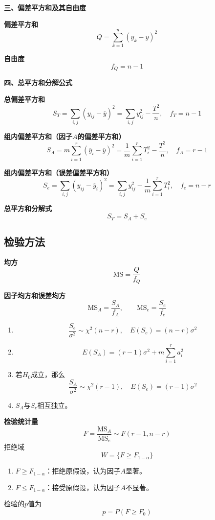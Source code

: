 \documentclass[lang = cn, scheme = chinese, thmcnt = section]{elegantbook}
\begin{document}
\textbf{三、偏差平方和及其自由度}

\textbf{偏差平方和}
$$
Q=\sum_{k=1}^{n}(y_k-\overline{y})^2
$$

\textbf{自由度}
$$
f_Q=n-1
$$

\textbf{四、总平方和分解公式}

\textbf{总偏差平方和}
$$
S_T=\sum_{i,j}{(y_{ij}-\overline{y})^2}=\sum_{i,j}{y_{ij}^2}-\frac{T^2}{n},\quad f_T=n-1
$$

\textbf{组内偏差平方和（因子$A$的偏差平方和）}
$$
S_A=m\sum_{i=1}^{r}{(\overline{y}_{i}-\overline{y})^2}=\frac{1}{m}\sum_{i=1}^{r}{T_i^2}-\frac{T^2}{n},\quad f_A=r-1
$$

\textbf{组内偏差平方和（误差偏差平方和）}
$$
S_e=\sum_{i,j}{(y_{ij}-\overline{y}_i)^2}=\sum_{i,j}{y_{ij}^2}-\frac{1}{m}\sum_{i=1}^{r}{T_i^2},\quad f_e=n-r
$$

\textbf{总平方和分解式}
$$
S_T=S_A+S_e
$$

\subsection{检验方法}

\textbf{均方}
$$
\mathrm{MS}=\frac{Q}{f_Q}
$$

\textbf{因子均方和误差均方}
$$
\mathrm{MS}_A=\frac{S_A}{f_A},\qquad \mathrm{MS}_e=\frac{S_e}{f_e}
$$

\begin{theorem}
	\begin{enumerate}
		\item 
		$$
		\frac{S_e}{\sigma^2}\sim\chi^2(n-r),\quad E(S_e)=(n-r)\sigma^2
		$$
		\item $$
		E(S_A)=(r-1)\sigma^2+m\sum_{i=1}^{r}{a_i^2}
		$$
		\item 若$H_0$成立，那么
		$$
		\frac{S_A}{\sigma^2}\sim\chi^2(r-1),\quad E(S_e)=(r-1)\sigma^2
		$$
		\item $S_A$与$S_e$相互独立。
	\end{enumerate}
\end{theorem}

\textbf{检验统计量}
$$
F=\frac{\mathrm{MS}_A}{\mathrm{MS}_e}\sim F(r-1,n-r)
$$
拒绝域
$$
W=\{F\ge F_{1-\alpha}\}
$$
\begin{enumerate}
	\item $F\ge F_{1-\alpha}$：拒绝原假设，认为因子$A$显著。
	\item $F\le F_{1-\alpha}$：接受原假设，认为因子$A$不显著。
\end{enumerate}
检验的$p$值为
$$
p=P(F\ge F_0)
$$
\end{document}
